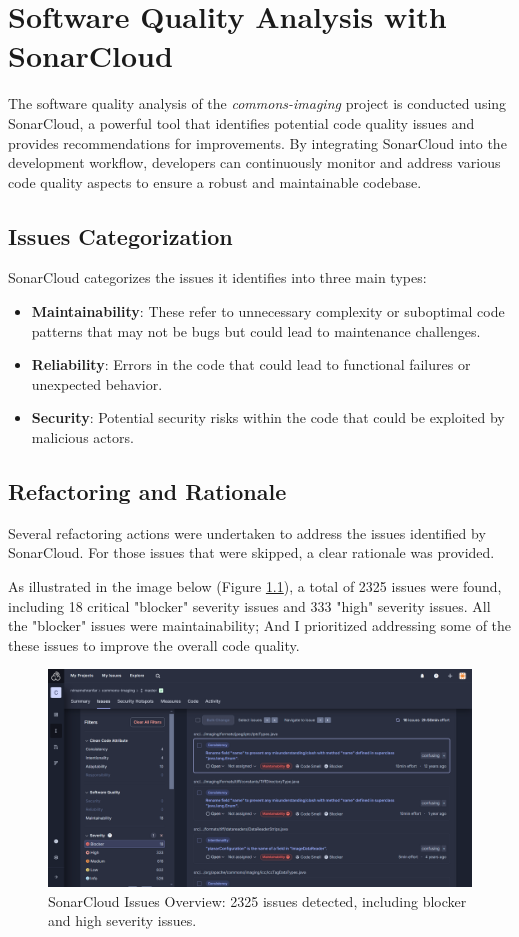 \documentclass[a4paper,12pt]{report}
\begin{document}
\chapter{Software Quality Analysis with SonarCloud}
The software quality analysis of the \textit{commons-imaging} project is conducted using SonarCloud, a powerful tool that identifies potential code quality issues and provides recommendations for improvements. By integrating SonarCloud into the development workflow, developers can continuously monitor and address various code quality aspects to ensure a robust and maintainable codebase.

\section{Issues Categorization}
SonarCloud categorizes the issues it identifies into three main types:
\begin{itemize}
    \item \textbf{Maintainability}: These refer to unnecessary complexity or suboptimal code patterns that may not be bugs but could lead to maintenance challenges.
    \item \textbf{Reliability}: Errors in the code that could lead to functional failures or unexpected behavior.
    \item \textbf{Security}: Potential security risks within the code that could be exploited by malicious actors.
\end{itemize}

\section{Refactoring and Rationale}
Several refactoring actions were undertaken to address the issues identified by SonarCloud. For those issues that were skipped, a clear rationale was provided. 

As illustrated in the image below (Figure \ref{fig:sonar_issues}), a total of 2325 issues were found, including 18 critical "blocker" severity issues and 333 "high" severity issues. All the "blocker" issues were maintainability; And I prioritized addressing some of the these issues to improve the overall code quality.

\begin{figure}[H]
    \centering
    \includegraphics[width=1\textwidth]{Report_Img/SonarQube_issues.png}
    \caption{SonarCloud Issues Overview: 2325 issues detected, including blocker and high severity issues.}
    \label{fig:sonar_issues}
\end{figure}
\end{document}

